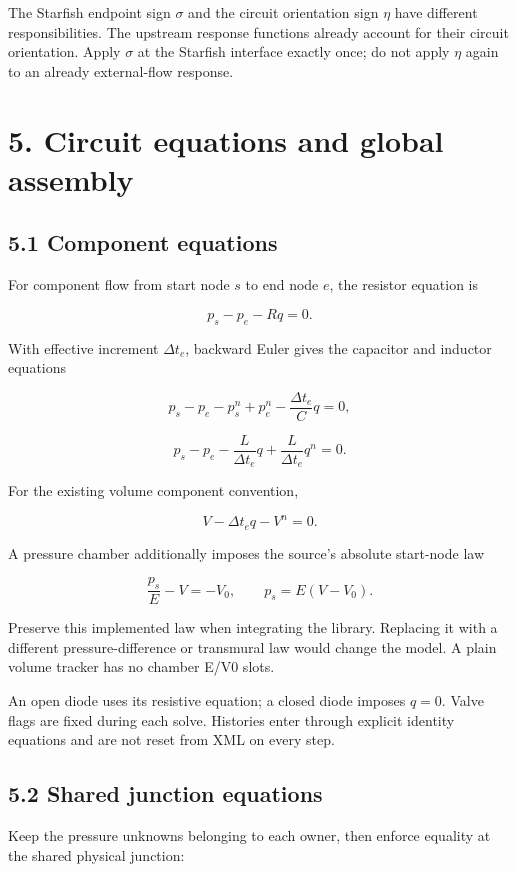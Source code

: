 \documentclass[11pt,a4paper]{article}
\begin{document}
The Starfish endpoint sign \(\sigma\) and the circuit orientation sign \(\eta\) have different responsibilities. The upstream response functions already account for their circuit orientation. Apply \(\sigma\) at the Starfish interface exactly once; do not apply \(\eta\) again to an already external-flow response.

\section{5. Circuit equations and global assembly}
\subsection{5.1 Component equations}
For component flow from start node \(s\) to end node \(e\), the resistor equation is


\nopagebreak[3]
\[
p_s-p_e-Rq=0.
\]


With effective increment \(\Delta t_e\), backward Euler gives the capacitor and inductor equations


\nopagebreak[3]
\[
p_s-p_e-p_s^n+p_e^n-\frac{\Delta t_e}{C}q=0,
\]



\nopagebreak[3]
\[
p_s-p_e-\frac{L}{\Delta t_e}q+\frac{L}{\Delta t_e}q^n=0.
\]


For the existing volume component convention,


\nopagebreak[3]
\[
V-\Delta t_e q-V^n=0.
\]


A pressure chamber additionally imposes the source's absolute start-node law


\nopagebreak[3]
\[
\frac{p_s}{E}-V=-V_0,
\qquad p_s=E(V-V_0).
\]


Preserve this implemented law when integrating the library. Replacing it with a different pressure-difference or transmural law would change the model. A plain volume tracker has no chamber E/V0 slots.

An open diode uses its resistive equation; a closed diode imposes \(q = 0\). Valve flags are fixed during each solve. Histories enter through explicit identity equations and are not reset from XML on every step.

\subsection{5.2 Shared junction equations}
Keep the pressure unknowns belonging to each owner, then enforce equality at the shared physical junction:
\end{document}
